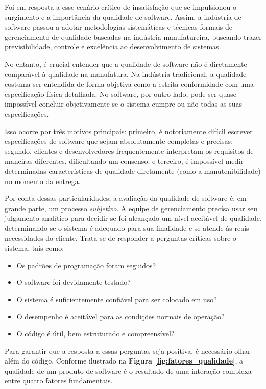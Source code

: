 \documentclass[12pt,a4paper,twoside]{report}
\begin{document}
Foi em resposta a esse cenário crítico de insatisfação que se impulsionou o surgimento e a importância da qualidade de software. Assim, a indústria de software passou a adotar metodologias sistemáticas e técnicas formais de gerenciamento de qualidade baseadas na indústria manufatureira, buscando trazer previsibilidade, controle e excelência ao desenvolvimento de sistemas.

No entanto, é crucial entender que a qualidade de software não é diretamente comparável à qualidade na manufatura. Na indústria tradicional, a qualidade costuma ser entendida de forma objetiva como a estrita conformidade com uma especificação física detalhada. No software, por outro lado, pode ser quase impossível concluir objetivamente se o sistema cumpre ou não todas as suas especificações. 

Isso ocorre por três motivos principais: primeiro, é notoriamente difícil escrever especificações de software que sejam absolutamente completas e precisas; segundo, clientes e desenvolvedores frequentemente interpretam os requisitos de maneiras diferentes, dificultando um consenso; e terceiro, é impossível medir determinadas características de qualidade diretamente (como a manutenibilidade) no momento da entrega.

Por conta dessas particularidades, a avaliação da qualidade de software é, em grande parte, um processo \emph{subjetivo}. A equipe de gerenciamento precisa usar seu julgamento analítico para decidir se foi alcançado um nível aceitável de qualidade, determinando se o sistema é adequado para sua finalidade e se atende às reais necessidades do cliente. Trata-se de responder a perguntas críticas sobre o sistema, tais como: 

\begin{itemize}
    \item Os padrões de programação foram seguidos?
    \item O software foi devidamente testado?
    \item O sistema é suficientemente confiável para ser colocado em uso?
    \item O desempenho é aceitável para as condições normais de operação?
    \item O código é útil, bem estruturado e compreensível?
\end{itemize}

Para garantir que a resposta a essas perguntas seja positiva, é necessário olhar além do código. Conforme ilustrado na \textbf{Figura \ref{fig:fatores_qualidade}}, a qualidade de um produto de software é o resultado de uma interação complexa entre quatro fatores fundamentais.
\end{document}
